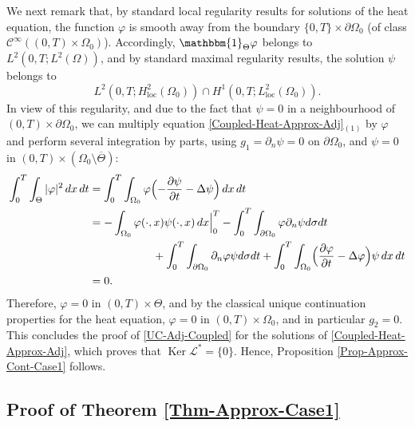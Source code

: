 \documentclass[JEP,XML,SOM,Unicode,NoFloatCountersInSection]{cedram}
\newcommand{\loc}{\mathrm{loc}}
\DeclareMathOperator{\Ker}{Ker}
\theoremstyle{definition}
\begin{document}
We next remark that, by standard local regularity results for solutions of the heat equation, the function $\varphi$ is smooth away from the boundary $\{0,T\}\times\partial \Omega_0$ (of class $\mathscr{C}^\infty((0,T) \times \Omega_0)$). Accordingly, $\mathbbm{1}_{\Theta}\varphi $ belongs to $L^2(0,T; L^2(\Omega))$, and by standard maximal regularity results, the solution $\psi$ belongs to
\[
L^2(0,T; H^2_{\loc}(\Omega_0)) \cap H^1(0,T; L^2_{\loc}(\Omega_0)).
\]
In view of this regularity, and due to the fact that $\psi = 0$ in a neighbourhood of $(0,T) \times \partial \Omega_0$, we can multiply equation \eqref{Coupled-Heat-Approx-Adj}$_{(1)}$ by $\varphi$ and perform several integration by parts, using $g_1 = \partial_n\psi =0$ on $\partial\Omega_0$, and $\psi = 0$ in $(0,T) \times (\Omega_0 \setminus \overline{\Theta})$:
\begin{align*}
\int_0^T \int_{\Theta} |\varphi|^2 \, dx\,dt
&=
\int_0^T \int_{\Omega_0} \varphi \Bigl(- \dfrac{\partial \psi}{\partial t}-\Delta \psi\Bigr) \, dx\,dt
\\
&=
- \int_{\Omega_0} \varphi(\cdot,x) \psi(\cdot, x)\, dx\Big|_0^T
-\int_0^T \int_{\partial\Omega_0} \varphi \partial_n \psi d\sigma dt\\
&\hspace*{2cm}+
\int_0^T \int_{\partial\Omega_0} \partial_n \varphi \psi d\sigma dt
+\int_0^T \int_{\Omega_0} \Bigl(\dfrac{\partial \varphi}{\partial t}-\Delta \varphi \Bigr) \psi \, dx\,dt\\
&=0.
\end{align*}
Therefore, $\varphi = 0$ in $(0,T) \times \Theta$, and by the classical unique continuation properties for the heat equation, $\varphi = 0$ in $(0,T) \times \Omega_0$, and in particular $g_2 = 0$. This concludes the proof of \eqref{UC-Adj-Coupled} for the solutions of \eqref{Coupled-Heat-Approx-Adj}, which proves that $\Ker\mathcal{L}^* = \{0\}$. Hence, Proposition \ref{Prop-Approx-Cont-Case1} follows.

\subsection{Proof of Theorem \ref{Thm-Approx-Case1}}\label{Subsec-Proof-Approx-Case1}
\end{document}
